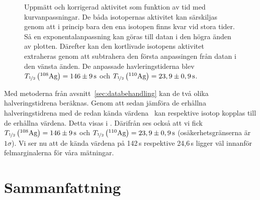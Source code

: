 \documentclass[11pt,a4paper, english, swedish
]{article}
\newcommand{\Thalv}[2]{\ensuremath{}T_{\nicefrac{1}{2}}\left(^{#1}\text{#2}\right)}
\begin{document}
\begin{figure}\centering

\caption{Uppmätt och korrigerad aktivitet som funktion av tid med
  kurvanpassningar. De båda isotopernas aktivitet kan särskiljas genom
att i princip bara den ena isotopen finns kvar vid stora tider. Så en
exponentalanpassning kan göras till datan i den högra änden av
plotten. Därefter kan den kortlivade isotopens aktivitet extraheras
genom att subtrahera den första anpassingen från datan i den vänsta
änden. De anpassade havleringstiderna blev
$\Thalv{108}{Ag}=\unit[146\pm9]{s}$ och $\Thalv{110}{Ag}=\unit[23,9\pm0,9]{s}$.}
\label{fig:data}
\end{figure}

Med metoderna från avsnitt~\ref{sec:databehandling} kan de två olika halveringstidrena beräknas. Genom att sedan jämföra de erhållna halveringstidrena med de redan kända värdena~\cite{wiki_silver} kan respektive isotop kopplas till de erhållna värdena. Detta visas i . Därifrån ses också att vi fick $\Thalv{108}{Ag}=\unit[146\pm9]{s}$ och $\Thalv{110}{Ag}=\unit[23,9\pm0,9]{s}$ (osäkerhetsgränserna är $1\sigma$).
Vi ser nu att de kända värdena på 142\,s respektive 24,6\,s ligger väl innanför felmarginalerna för våra mätningar. 



\section{Sammanfattning}

 
\end{document}
